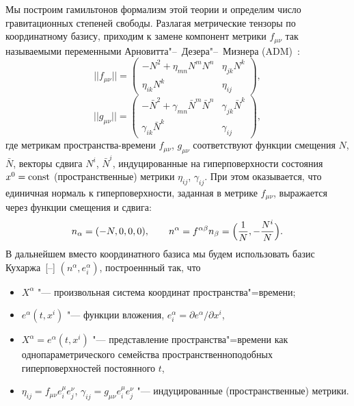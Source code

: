 Мы построим гамильтонов формализм этой теории и определим число гравитационных   степеней свободы.  
Разлагая метрические тензоры по координатному базису, приходим к замене компонент метрики $f_{\mu\nu}$  так называемыми переменными Арновитта"--~Дезера"--~Мизнера (ADM)~\cite{ADM}:
$$||f_{\mu\nu}||=\left(\begin{array}{cc}-N^2+\eta_{mn}N^mN^n & \eta_{jk}N^k\\ \eta_{ik}N^k & \eta_{ij}\end{array}\right),
$$
$$||g_{\mu\nu}||=\left(\begin{array}{cc}-\bar N^2+\gamma_{mn}\bar N^m\bar N^n & \gamma_{jk}\bar N^k\\ \gamma_{ik}\bar N^k & \gamma_{ij}\end{array}\right),
$$
где метрикам пространства-времени $f_{\mu\nu}$, $g_{\mu\nu}$ соответствуют  функции смещения $N$, $\bar N$, векторы сдвига $N^i$, $\bar N^i$,   индуцированные на гиперповерхности состояния  $x^0=\rm const$ (пространственные) метрики $\eta_{ij}$, $\gamma_{ij}$. 
При этом оказывается, что единичная нормаль к гиперповерхности, заданная в метрике $f_{\mu\nu}$, выражается через функции смещения и сдвига: 
$$
n_\alpha=(-N, 0, 0, 0),\qquad n^\alpha=f^{\alpha\beta}n_\beta=\Bigl(\frac{1}{N},-\frac{N^i}{N} \Bigr).
$$
В дальнейшем вместо координатного базиса мы будем использовать базис Кухаржа~[--] $(n^\alpha,e^\alpha_i)$, построеннный так, что
\begin{itemize}
\item $X^\alpha$ "---  произвольная система координат пространства"=времени; 
\item $e^\alpha(t,x^i)$ "--- функции вложения, $e^\alpha_i={\partial e^\alpha}\big/{\partial x^i}$,
\item 
$
X^\alpha=e^\alpha(t,x^i)
$
"--- представление пространства"=времени как однопараметрического семейства пространственноподобных гиперповерхностей постоянного $t$,
\item $\eta_{ij}=f_{\mu\nu}e^\mu_i e^\nu_j$, $\gamma_{ij}=g_{\mu\nu}e^{\mu}_{i}e^{\nu}_{j}$ "--- индуцированные (пространственные) метрики. 
\end{itemize}
